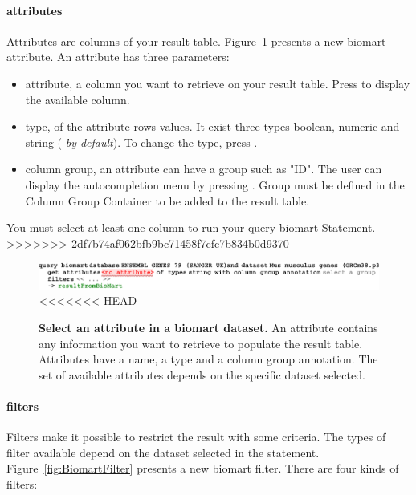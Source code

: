 \begin{itemize}
\begin{remark}
\paragraph{attributes}
Attributes are columns of your result table. Figure~\ref{fig:attributeBiomart} presents a new biomart attribute. An attribute has three parameters:
\begin{itemize}
\item attribute, a column you want to retrieve on your result table. Press \keys{\ctrl+\space} to display the available column.
\item type, of  the attribute rows values. It exist three  types
boolean, numeric and string (\textit{ by default}). To change the type, press \keys{\ctrl+\space}.
\item column group, an attribute can have a group such as "ID". The user can display the autocompletion menu by pressing \keys{\ctrl+\space}. Group must be defined in the Column Group Container to be added to the result table.
\end{itemize}

\begin{remark}
You must select at least one column to run your query biomart Statement.
>>>>>>> 2df7b74af062bfb9bc71458f7cfc7b834b0d9370
\end{remark}

 \begin{figure}[h!tbp]
  \centering
  \includegraphics[width=\figWidthWide]{figures/BiomartAttribute.pdf}
<<<<<<< HEAD
\caption[Select an attribute in a biomart dataset.]{\textbf{Select an attribute in a biomart dataset.} An attribute contains any information you want to retrieve to populate the result table. Attributes have a name, a type and a column group annotation. The set of available attributes depends on the specific dataset selected.}
\label{fig:attributeBiomart}
\end{figure}
\paragraph{filters}
Filters make it possible to restrict the result with some criteria. The types of filter available depend on the dataset selected in the statement. Figure~\ref{fig:BiomartFilter} presents a new biomart filter. There are four kinds of filters: 
\begin{itemize}


\end{itemize}
\end{remark}
\end{itemize}

